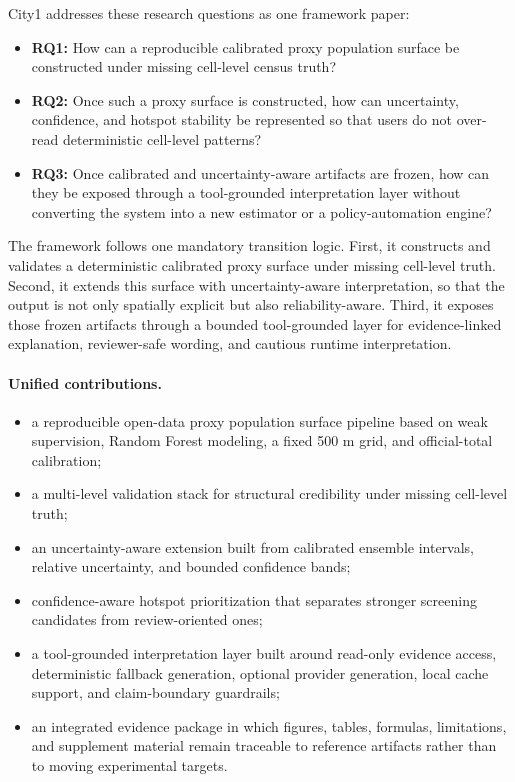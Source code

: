 City1 addresses these research questions as one framework paper:

\begin{itemize}
\item \textbf{RQ1:} How can a reproducible calibrated proxy population surface be constructed under missing cell-level census truth?
\item \textbf{RQ2:} Once such a proxy surface is constructed, how can uncertainty, confidence, and hotspot stability be represented so that users do not over-read deterministic cell-level patterns?
\item \textbf{RQ3:} Once calibrated and uncertainty-aware artifacts are frozen, how can they be exposed through a tool-grounded interpretation layer without converting the system into a new estimator or a policy-automation engine?
\end{itemize}

The framework follows one mandatory transition logic. First, it constructs and validates a deterministic calibrated proxy surface under missing cell-level truth. Second, it extends this surface with uncertainty-aware interpretation, so that the output is not only spatially explicit but also reliability-aware. Third, it exposes those frozen artifacts through a bounded tool-grounded layer for evidence-linked explanation, reviewer-safe wording, and cautious runtime interpretation.

\paragraph{Unified contributions.}
\begin{itemize}
\item a reproducible open-data proxy population surface pipeline based on weak supervision, Random Forest modeling, a fixed 500 m grid, and official-total calibration;
\item a multi-level validation stack for structural credibility under missing cell-level truth;
\item an uncertainty-aware extension built from calibrated ensemble intervals, relative uncertainty, and bounded confidence bands;
\item confidence-aware hotspot prioritization that separates stronger screening candidates from review-oriented ones;
\item a tool-grounded interpretation layer built around read-only evidence access, deterministic fallback generation, optional provider generation, local cache support, and claim-boundary guardrails;
\item an integrated evidence package in which figures, tables, formulas, limitations, and supplement material remain traceable to reference artifacts rather than to moving experimental targets.
\end{itemize}

